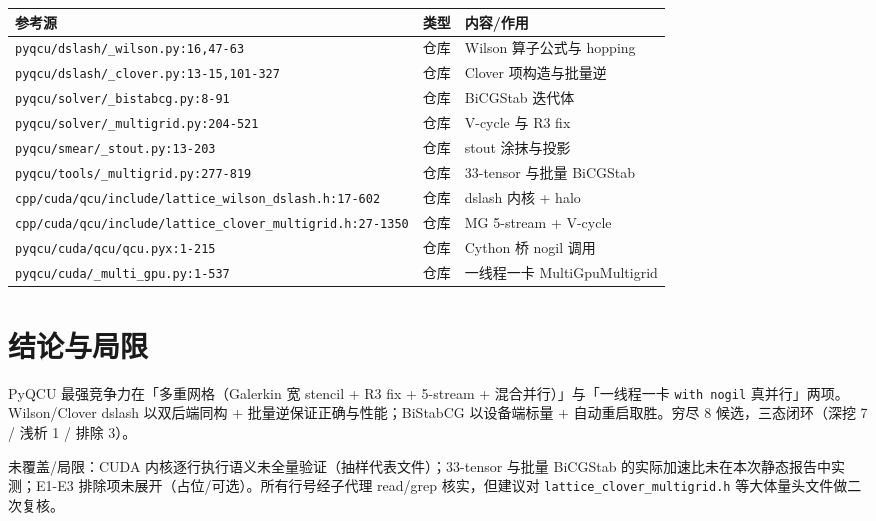 \documentclass[UTF8]{ctexart}
\begin{document}
\begin{xltabular}{\textwidth}{llX}
\toprule
\textcolor{evidence}{参考源} & 类型 & 内容/作用 \\
\midrule
\endhead
\texttt{\nolinkurl{pyqcu/dslash/_wilson.py:16,47-63}} & 仓库 & Wilson 算子公式与 hopping \\
\texttt{\nolinkurl{pyqcu/dslash/_clover.py:13-15,101-327}} & 仓库 & Clover 项构造与批量逆 \\
\texttt{\nolinkurl{pyqcu/solver/_bistabcg.py:8-91}} & 仓库 & BiCGStab 迭代体 \\
\texttt{\nolinkurl{pyqcu/solver/_multigrid.py:204-521}} & 仓库 & V-cycle 与 R3 fix \\
\texttt{\nolinkurl{pyqcu/smear/_stout.py:13-203}} & 仓库 & stout 涂抹与投影 \\
\texttt{\nolinkurl{pyqcu/tools/_multigrid.py:277-819}} & 仓库 & 33-tensor 与批量 BiCGStab \\
\texttt{\nolinkurl{cpp/cuda/qcu/include/lattice_wilson_dslash.h:17-602}} & 仓库 & dslash 内核 + halo \\
\texttt{\nolinkurl{cpp/cuda/qcu/include/lattice_clover_multigrid.h:27-1350}} & 仓库 & MG 5-stream + V-cycle \\
\texttt{\nolinkurl{pyqcu/cuda/qcu/qcu.pyx:1-215}} & 仓库 & Cython 桥 nogil 调用 \\
\texttt{\nolinkurl{pyqcu/cuda/_multi_gpu.py:1-537}} & 仓库 & 一线程一卡 MultiGpuMultigrid \\
\bottomrule
\end{xltabular}

\section{结论与局限}

\begin{conclbox}
PyQCU 最强竞争力在「多重网格（Galerkin 宽 stencil + R3 fix + 5-stream + 混合并行）」与「一线程一卡 \texttt{with nogil} 真并行」两项。Wilson/Clover dslash 以双后端同构 + 批量逆保证正确与性能；BiStabCG 以设备端标量 + 自动重启取胜。穷尽 8 候选，三态闭环（深挖 7 / 浅析 1 / 排除 3）。
\end{conclbox}

\begin{warnbox}
未覆盖/局限：CUDA 内核逐行执行语义未全量验证（抽样代表文件）；33-tensor 与批量 BiCGStab 的实际加速比未在本次静态报告中实测；E1-E3 排除项未展开（占位/可选）。所有行号经子代理 read/grep 核实，但建议对 \texttt{lattice\_clover\_multigrid.h} 等大体量头文件做二次复核。
\end{warnbox}
\end{document}
